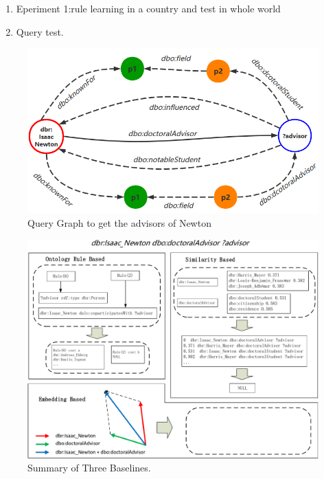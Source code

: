 \documentclass[runningheads]{llncs}
\begin{document}
\begin{enumerate}
  \item Eperiment 1:rule learning in a country and test in whole world
  \item Query test.
\end{enumerate}
\begin{figure}
\includegraphics[width=\textwidth]{Newton.png}
\caption{Query Graph to get the advisors of Newton} \label{Newton_fig}
\end{figure}
\begin{figure}
\includegraphics[width=\textwidth]{summary_three_cropped.pdf}
\caption{Summary of Three Baselines.} \label{summary_three}
\end{figure}



\end{document}
